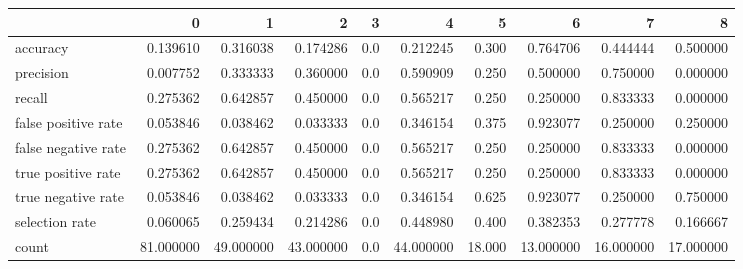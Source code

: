 \begin{tabular}{lrrrrrrrrr}
\toprule
{} &          0 &          1 &          2 &    3 &          4 &       5 &          6 &          7 &          8 \\
\midrule
accuracy            &   0.139610 &   0.316038 &   0.174286 &  0.0 &   0.212245 &   0.300 &   0.764706 &   0.444444 &   0.500000 \\
precision           &   0.007752 &   0.333333 &   0.360000 &  0.0 &   0.590909 &   0.250 &   0.500000 &   0.750000 &   0.000000 \\
recall              &   0.275362 &   0.642857 &   0.450000 &  0.0 &   0.565217 &   0.250 &   0.250000 &   0.833333 &   0.000000 \\
false positive rate &   0.053846 &   0.038462 &   0.033333 &  0.0 &   0.346154 &   0.375 &   0.923077 &   0.250000 &   0.250000 \\
false negative rate &   0.275362 &   0.642857 &   0.450000 &  0.0 &   0.565217 &   0.250 &   0.250000 &   0.833333 &   0.000000 \\
true positive rate  &   0.275362 &   0.642857 &   0.450000 &  0.0 &   0.565217 &   0.250 &   0.250000 &   0.833333 &   0.000000 \\
true negative rate  &   0.053846 &   0.038462 &   0.033333 &  0.0 &   0.346154 &   0.625 &   0.923077 &   0.250000 &   0.750000 \\
selection rate      &   0.060065 &   0.259434 &   0.214286 &  0.0 &   0.448980 &   0.400 &   0.382353 &   0.277778 &   0.166667 \\
count               &  81.000000 &  49.000000 &  43.000000 &  0.0 &  44.000000 &  18.000 &  13.000000 &  16.000000 &  17.000000 \\
\bottomrule
\end{tabular}
